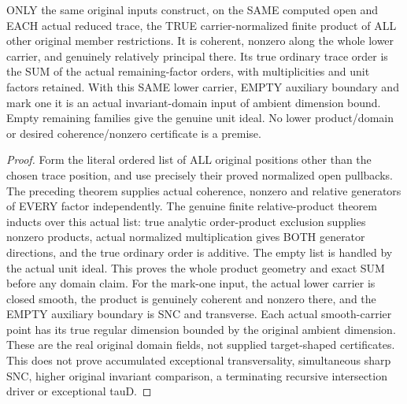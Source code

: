 \begin{theorem}
\label{hir:sharp-original-first-good-actual-lower-product-domain}
\leanok
ONLY the same original inputs construct, on the SAME computed open and
EACH actual reduced trace, the TRUE carrier-normalized finite product of
ALL other original member restrictions. It is coherent, nonzero along
the whole lower carrier, and genuinely relatively principal there. Its
true ordinary trace order is the SUM of the actual remaining-factor
orders, with multiplicities and unit factors retained. With this SAME
lower carrier, EMPTY auxiliary boundary and mark one it is an actual
invariant-domain input of ambient dimension bound. Empty remaining
families give the genuine unit ideal. No lower product/domain or desired
coherence/nonzero certificate is a premise.
\end{theorem}
\begin{proof}
Form the literal ordered list of ALL original positions other than the
chosen trace position, and use precisely their proved normalized open
pullbacks. The preceding theorem supplies actual coherence, nonzero and
relative generators of EVERY factor independently. The genuine finite
relative-product theorem inducts over this actual list: true analytic
order-product exclusion supplies nonzero products, actual normalized
multiplication gives BOTH generator directions, and the true ordinary
order is additive. The empty list is handled by the actual unit ideal.
This proves the whole product geometry and exact SUM before any domain
claim. For the mark-one input, the actual lower carrier is closed smooth,
the product is genuinely coherent and nonzero there, and the EMPTY
auxiliary boundary is SNC and transverse. Each actual smooth-carrier
point has its true regular dimension bounded by the original ambient
dimension. These are the real original domain fields, not supplied
target-shaped certificates. This does not prove accumulated exceptional
transversality, simultaneous sharp SNC, higher original invariant
comparison, a terminating recursive intersection driver or exceptional
tauD.
\end{proof}
